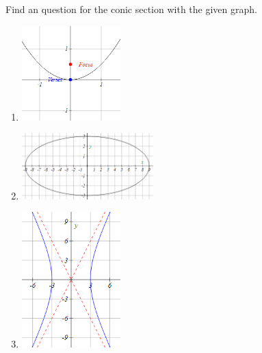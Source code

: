 \begin{exercise}
    Find an question for the conic section with the given graph.
   \begin{enumerate}
       \item \mbox{}
       
       \includegraphics[width=0.3\textwidth]{figs/ParabolaEqFromGraph.png}
       \item \mbox{}
       
       \includegraphics[width=0.4\textwidth]{figs/EllipseEqFromGraph.png}
       \item\mbox{}
       
       \includegraphics[width=0.3\textwidth]{figs/HyperbolaEqFromGraph.png}
   \end{enumerate} 
\end{exercise}
